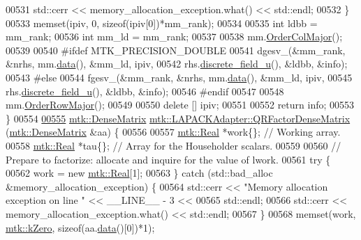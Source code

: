 \begin{DoxyCode}
00531     std::cerr << memory\_allocation\_exception.what() << std::endl;
00532   \}
00533   memset(ipiv, 0, \textcolor{keyword}{sizeof}(ipiv[0])*mm\_rank);
00534 
00535   \textcolor{keywordtype}{int} ldbb = mm\_rank;
00536   \textcolor{keywordtype}{int} mm\_ld = mm\_rank;
00537 
00538   mm.\hyperlink{classmtk_1_1DenseMatrix_a59b9bea24acf39dca64e8549b3527463}{OrderColMajor}();
00539 
00540 \textcolor{preprocessor}{  #ifdef MTK\_PRECISION\_DOUBLE}
00541   dgesv\_(&mm\_rank, &nrhs, mm.\hyperlink{classmtk_1_1DenseMatrix_a16b3ff56feb2658b9fc7147d1de4d8e7}{data}(), &mm\_ld, ipiv,
00542          rhs.\hyperlink{classmtk_1_1UniStgGrid1D_acf28d702f6e702599986afcb253bbfc1}{discrete\_field\_u}(), &ldbb, &info);
00543 \textcolor{preprocessor}{  #else}
00544   fgesv\_(&mm\_rank, &nrhs, mm.\hyperlink{classmtk_1_1DenseMatrix_a16b3ff56feb2658b9fc7147d1de4d8e7}{data}(), &mm\_ld, ipiv,
00545          rhs.\hyperlink{classmtk_1_1UniStgGrid1D_acf28d702f6e702599986afcb253bbfc1}{discrete\_field\_u}(), &ldbb, &info);
00546 \textcolor{preprocessor}{  #endif}
00547 
00548   mm.\hyperlink{classmtk_1_1DenseMatrix_ac2949efba3e8278335d45418c85433e4}{OrderRowMajor}();
00549 
00550   \textcolor{keyword}{delete} [] ipiv;
00551 
00552   \textcolor{keywordflow}{return} info;
00553 \}
00554 
\hypertarget{mtk__lapack__adapter_8cc_source_l00555}{}\hyperlink{classmtk_1_1LAPACKAdapter_ae5c6e78c9c819c9ac7a6f31bfd011d7a}{00555} \hyperlink{classmtk_1_1DenseMatrix}{mtk::DenseMatrix} \hyperlink{classmtk_1_1LAPACKAdapter_ae5c6e78c9c819c9ac7a6f31bfd011d7a}{mtk::LAPACKAdapter::QRFactorDenseMatrix}
      (\hyperlink{classmtk_1_1DenseMatrix}{mtk::DenseMatrix} &aa) \{
00556 
00557   \hyperlink{group__c01-roots_gac080bbbf5cbb5502c9f00405f894857d}{mtk::Real} *work\{\}; \textcolor{comment}{// Working array.}
00558   \hyperlink{group__c01-roots_gac080bbbf5cbb5502c9f00405f894857d}{mtk::Real} *tau\{\};  \textcolor{comment}{// Array for the Householder scalars.}
00559 
00560   \textcolor{comment}{// Prepare to factorize: allocate and inquire for the value of lwork.}
00561   \textcolor{keywordflow}{try} \{
00562     work = \textcolor{keyword}{new} \hyperlink{group__c01-roots_gac080bbbf5cbb5502c9f00405f894857d}{mtk::Real}[1];
00563   \} \textcolor{keywordflow}{catch} (std::bad\_alloc &memory\_allocation\_exception) \{
00564     std::cerr << \textcolor{stringliteral}{"Memory allocation exception on line "} << \_\_LINE\_\_ - 3 <<
00565       std::endl;
00566     std::cerr << memory\_allocation\_exception.what() << std::endl;
00567   \}
00568   memset(work, \hyperlink{group__c01-roots_ga59a451a5fae30d59649bcda274fea271}{mtk::kZero}, \textcolor{keyword}{sizeof}(aa.\hyperlink{classmtk_1_1DenseMatrix_a16b3ff56feb2658b9fc7147d1de4d8e7}{data}()[0])*1);

\end{DoxyCode}
